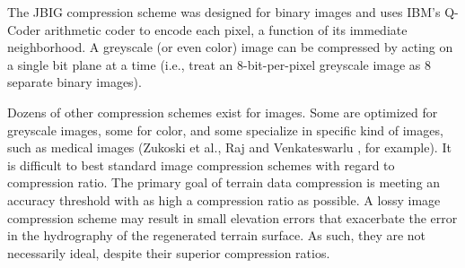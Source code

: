 The JBIG compression scheme \cite{Kyrki99jbigimage} was designed for binary images and uses IBM's Q-Coder arithmetic coder to encode each pixel, a function of its immediate neighborhood. A greyscale (or even color) image can be compressed by acting on a single bit plane at a time (i.e., treat an 8-bit-per-pixel greyscale image as 8 separate binary images). 

Dozens of other compression schemes exist for images. Some are optimized for greyscale images, some for color, and some specialize in specific kind of images, such as medical images (Zukoski et al.\cite{Zukoski:2006:NAM:1356588.1356594}, Raj and Venkateswarlu \cite{Raj:2007:NAM:1335117.1335447}, for example).
% 
It is difficult to best standard image compression schemes with regard to compression ratio. The primary goal of terrain data compression is meeting an accuracy threshold with as high a compression ratio as possible. A lossy image compression scheme may result in small elevation errors that exacerbate the error in the hydrography of the regenerated terrain surface. As such, they are not necessarily ideal, despite their superior compression ratios. 



